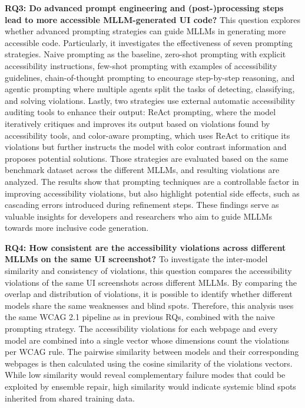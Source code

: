 \textbf{RQ3: Do advanced prompt engineering and (post-)processing steps lead to more accessible MLLM-generated UI
code?}
This question explores whether advanced prompting strategies can guide 
MLLMs in generating more accessible code. Particularly, it investigates
the effectiveness of seven prompting strategies. Naive prompting as the
baseline, zero-shot prompting with explicit accessibility instructions,
few-shot prompting with examples of accessibility guidelines,
chain-of-thought prompting to encourage step-by-step reasoning, and
agentic prompting where multiple agents split the tasks of
detecting, classifying, and solving violations. 
Lastly, two strategies use external automatic accessibility auditing tools to enhance their output:
ReAct prompting, where the model iteratively critiques and improves 
its output based on violations found by accessibility tools, 
and color-aware prompting, which uses ReAct to critique its violations but 
further instructs the model with color contrast information and proposes
potential solutions. Those strategies are evaluated based on the same 
benchmark dataset across the different MLLMs, and resulting violations 
are analyzed. 
The results show that prompting techniques are a controllable
factor in improving accessibility violations, but also highlight
potential side effects, such as cascading
errors introduced during refinement steps.
These findings serve as valuable insights for developers and researchers
who aim to guide MLLMs towards more inclusive code generation.\newline


\textbf{RQ4: How consistent are the accessibility violations across different MLLMs on the same UI screenshot?}
To investigate the inter-model similarity and consistency of violations, this question compares the 
accessibility violations of the same UI screenshots 
across different MLLMs. By comparing the overlap and 
distribution of violations, it is possible to identify 
whether different models share the same weaknesses and
blind spots. Therefore, this analysis uses the same WCAG 
2.1 pipeline as in previous RQs, combined with the naive prompting 
strategy. The accessibility violations for each webpage 
and every model are combined into a single vector whose 
dimensions count the violations per WCAG rule. The pairwise similarity 
between models and their corresponding webpages is then calculated 
using the cosine similarity of the violations vectors. While 
low similarity would reveal 
complementary failure modes that could be exploited by ensemble 
repair, high similarity would indicate systemic blind spots 
inherited from shared training data.\newline




